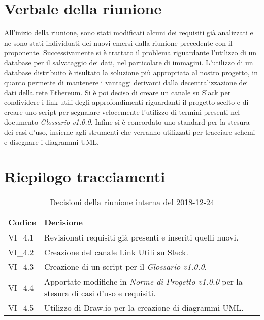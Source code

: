 \section{Verbale della riunione}
All'inizio della riunione, sono stati modificati alcuni dei requisiti già analizzati e ne sono 
stati individuati dei nuovi emersi dalla riunione precedente con il proponente.
Successivamente si è trattato il problema riguardante l'utilizzo di un database per il salvataggio dei dati, nel particolare di immagini. L'utilizzo di un database distribuito è risultato la soluzione più appropriata al nostro progetto, in quanto permette di mantenere i vantaggi derivanti dalla decentralizzazione dei dati della rete Ethereum\glo. \newline
Si è poi deciso di creare un canale su Slack per condividere i link utili degli
approfondimenti riguardanti il progetto scelto e di creare uno script per segnalare
velocemente l'utilizzo di termini presenti nel documento \textit{Glossario v1.0.0}.
Infine si è concordato uno standard per la stesura dei casi d'uso, insieme agli 
strumenti che verranno utilizzati per tracciare schemi e disegnare i diagrammi UML.

\pagebreak

\section{Riepilogo tracciamenti}

	
		
	\begin{longtable}{ >{\centering}p{} >{}p{}}
		\caption{Decisioni della riunione interna del 2018-12-24}\\	
		\rowcolorhead
		\textbf{\color{white}Codice} 
		& \centering\textbf{\color{white}Decisione} 
		\tabularnewline 
		\endfirsthead
		
		VI\_4.1 & Revisionati requisiti già presenti e inseriti quelli nuovi.
		
		\tabularnewline 
		VI\_4.2 & Creazione del canale Link Utili su Slack.
	
		\tabularnewline 
		VI\_4.3 & Creazione di un script per il \textit{Glossario v1.0.0}.
		
		\tabularnewline
		VI\_4.4 & Apportate modifiche in \textit{Norme di Progetto v1.0.0} per 
		la 
				stesura di casi d'uso e requisiti.
		
		\tabularnewline
		VI\_4.5 & Utilizzo di Draw.io per la creazione di diagrammi 
		UML.			
	
	\end{longtable}



